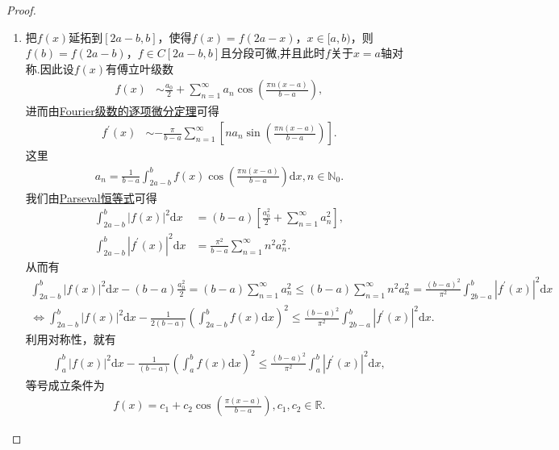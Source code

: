 \documentclass[../../main.tex]{subfiles}%
\begin{document}
\begin{proof}
\begin{enumerate}[(1)]
\item 把$f(x)$延拓到$[2a - b,b]$，使得$f(x)=f(2a - x)$，$x\in[a,b)$，则$f(b)=f(2a - b)$，$f\in C[2a - b,b]$且分段可微,并且此时$f$关于$x=a$轴对称.因此设$f(x)$有傅立叶级数
\begin{align*}
f(x) &\sim \frac{a_0}{2}+\sum_{n = 1}^{\infty}a_n\cos\left(\frac{\pi n(x - a)}{b - a}\right),
\end{align*}
进而由\hyperref[theorem:Fourier级数的逐项微分定理]{Fourier级数的逐项微分定理}可得
\begin{align*}
f^{\prime}(x) &\sim -\frac{\pi}{b - a}\sum_{n = 1}^{\infty}[na_n\sin\left(\frac{\pi n(x - a)}{b - a}\right)].
\end{align*}
这里
\begin{align*}
a_n=\frac{1}{b - a}\int_{2a - b}^{b}f(x)\cos\left(\frac{\pi n(x - a)}{b - a}\right)\mathrm{d}x, n\in\mathbb{N}_0.
\end{align*}
我们由\hyperref[theorem:Parseval恒等式]{Parseval恒等式}可得
\begin{align*}
\int_{2a - b}^{b}|f(x)|^2\mathrm{d}x&=(b - a)\left[\frac{a_0^2}{2}+\sum_{n = 1}^{\infty}a_n^2\right],\\
\int_{2a - b}^{b}|f^{\prime}(x)|^2\mathrm{d}x&=\frac{\pi^2}{b - a}\sum_{n = 1}^{\infty}n^2a_n^2.
\end{align*}
从而有
\begin{gather*}
\int_{2a-b}^b{|f(x)|^2\mathrm{d}x}-\left( b-a \right) \frac{a_{0}^{2}}{2}=\left( b-a \right) \sum_{n=1}^{\infty}{a_{n}^{2}}\leqslant \left( b-a \right) \sum_{n=1}^{\infty}{n^2a_{n}^{2}}=\frac{(b-a)^2}{\pi ^2}\int_{2b-a}^b{|f^{\prime}(x)|^2\mathrm{d}x}
\\
\iff \int_{2a-b}^b{|f(x)|^2\mathrm{d}x}-\frac{1}{2(b-a)}\left( \int_{2a-b}^b{f(x)\mathrm{d}x} \right) ^2\leqslant \frac{(b-a)^2}{\pi ^2}\int_{2b-a}^b{|f^{\prime}(x)|^2\mathrm{d}x}.
\end{gather*}
利用对称性，就有
\begin{align*}
\int_{a}^{b}|f(x)|^2\mathrm{d}x-\frac{1}{(b - a)}\left(\int_{a}^{b}f(x)\mathrm{d}x\right)^2\leqslant \frac{(b - a)^2}{\pi^2}\int_{a}^{b}|f^{\prime}(x)|^2\mathrm{d}x,
\end{align*}
等号成立条件为
\begin{align*}
f(x)=c_1 + c_2\cos\left(\frac{\pi(x - a)}{b - a}\right), c_1,c_2\in\mathbb{R}.
\end{align*}


\end{enumerate}
\end{proof}
\end{document}
